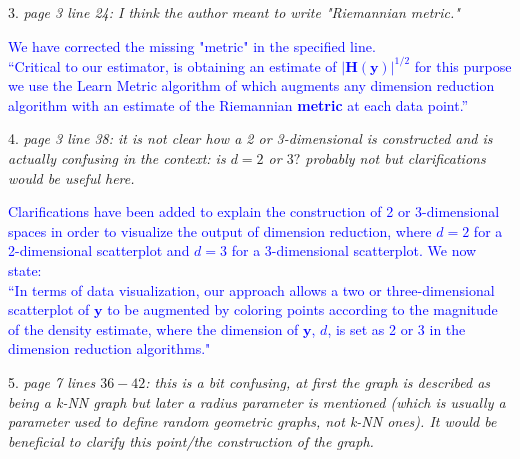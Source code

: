 \documentclass{article}
\begin{document}
3. \textit{page 3 line 24: I think the author meant to write "Riemannian metric."}

   \textcolor{blue}{%
   We have corrected the missing "metric" in the specified line. \\
   ``Critical to our estimator, is obtaining an estimate of $|\bm{H}(\bm{y})|^{1/2}$ for this purpose we use the Learn Metric algorithm of \cite{Perrault-Joncas2013-pq} which augments any dimension reduction algorithm with an estimate of the Riemannian \textbf{metric} at each data point.''
   }

4. \textit{page 3 line 38: it is not clear how a 2 or 3-dimensional is constructed and is actually confusing in the context: is \(d=2\) or \(3?\) probably not but clarifications would be useful here.}

   \textcolor{blue}{
   Clarifications have been added to explain the construction of 2 or 3-dimensional spaces in order to visualize the output of dimension reduction, where \(d=2\) for a 2-dimensional scatterplot and \(d=3\) for a 3-dimensional scatterplot. We now state: \\
  ``In terms of data visualization, our approach allows a two or three-dimensional scatterplot of \(\bm{y}\) to be augmented by coloring points according to the magnitude of the density estimate, where the dimension of \(\bm{y}\), \(d\), is set as 2 or 3 in the dimension reduction algorithms."
   }

5. \textit{page 7 lines \(36-42\): this is a bit confusing, at first the graph is described as being a k-NN graph but later a radius parameter is mentioned (which is usually a parameter used to define random geometric graphs, not k-NN ones). It would be beneficial to clarify this point/the construction of the graph.}
\end{document}
